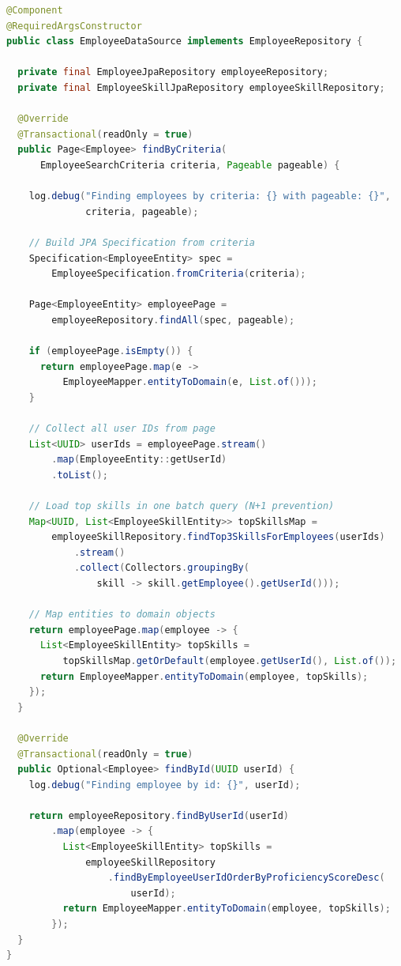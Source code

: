 \begin{lstlisting}[language=Java, caption=EmployeeDataSource - Persistence Implementation, label=lst:employee_datasource]
@Component
@RequiredArgsConstructor
public class EmployeeDataSource implements EmployeeRepository {

  private final EmployeeJpaRepository employeeRepository;
  private final EmployeeSkillJpaRepository employeeSkillRepository;

  @Override
  @Transactional(readOnly = true)
  public Page<Employee> findByCriteria(
      EmployeeSearchCriteria criteria, Pageable pageable) {

    log.debug("Finding employees by criteria: {} with pageable: {}", 
              criteria, pageable);

    // Build JPA Specification from criteria
    Specification<EmployeeEntity> spec = 
        EmployeeSpecification.fromCriteria(criteria);
    
    Page<EmployeeEntity> employeePage = 
        employeeRepository.findAll(spec, pageable);

    if (employeePage.isEmpty()) {
      return employeePage.map(e -> 
          EmployeeMapper.entityToDomain(e, List.of()));
    }

    // Collect all user IDs from page
    List<UUID> userIds = employeePage.stream()
        .map(EmployeeEntity::getUserId)
        .toList();

    // Load top skills in one batch query (N+1 prevention)
    Map<UUID, List<EmployeeSkillEntity>> topSkillsMap =
        employeeSkillRepository.findTop3SkillsForEmployees(userIds)
            .stream()
            .collect(Collectors.groupingBy(
                skill -> skill.getEmployee().getUserId()));

    // Map entities to domain objects
    return employeePage.map(employee -> {
      List<EmployeeSkillEntity> topSkills =
          topSkillsMap.getOrDefault(employee.getUserId(), List.of());
      return EmployeeMapper.entityToDomain(employee, topSkills);
    });
  }

  @Override
  @Transactional(readOnly = true)
  public Optional<Employee> findById(UUID userId) {
    log.debug("Finding employee by id: {}", userId);

    return employeeRepository.findByUserId(userId)
        .map(employee -> {
          List<EmployeeSkillEntity> topSkills =
              employeeSkillRepository
                  .findByEmployeeUserIdOrderByProficiencyScoreDesc(
                      userId);
          return EmployeeMapper.entityToDomain(employee, topSkills);
        });
  }
}
\end{lstlisting}

